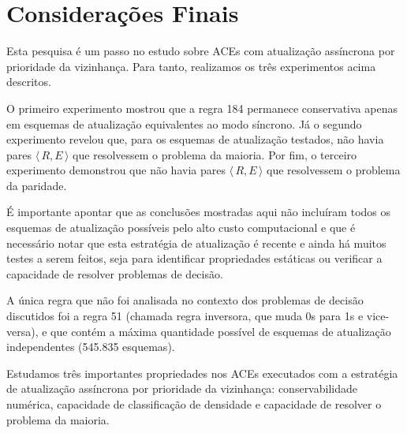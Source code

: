 \documentclass[a4paper,12pt]{ltxdoc}
\newcommand\tab[1][1cm]{\hspace*{#1}}
\begin{document}
\section{Considerações Finais} \label{comentarios-finais}

Esta pesquisa é um passo no estudo sobre ACEs com atualização assíncrona por prioridade da vizinhança. Para tanto, realizamos os três experimentos acima descritos.

\tab O primeiro experimento mostrou que a regra 184 permanece conservativa apenas em esquemas de atualização equivalentes ao modo síncrono. Já o segundo experimento revelou que, para os esquemas de atualização testados, não havia pares $\langle\,R,E\,\rangle$ que resolvessem o problema da maioria. Por fim, o terceiro experimento demonstrou que não havia pares $\langle\,R,E\,\rangle$ que resolvessem o problema da paridade.

\tab É importante apontar que as conclusões mostradas aqui não incluíram todos os esquemas de atualização possíveis pelo alto custo computacional e que é necessário notar que esta estratégia de atualização é recente e ainda há muitos testes a serem feitos, seja para identificar propriedades estáticas ou verificar a capacidade de resolver problemas de decisão.

\tab A única regra que não foi analisada no contexto dos problemas de decisão discutidos foi a regra 51 (chamada regra inversora, que muda 0s para 1s e vice-versa), e que contém a máxima quantidade possível de esquemas de atualização independentes (545.835 esquemas).

\tab Estudamos três importantes propriedades nos ACEs executados com a estratégia de atualização assíncrona por prioridade da vizinhança: conservabilidade numérica, capacidade de classificação de densidade e capacidade de resolver o problema da maioria. 





\end{document}
